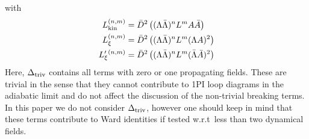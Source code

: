 \documentclass[a4paper,12pt]{article}
\newcommand{\Lkin}{L_{\rm kin}}
\newcommand{\Lxi}{L_{\xi}}
\newcommand{\Lxib}{L_{\xi}'{}}
\begin{document}
with
\begin{align}
\Lkin^{(n,m)} &= \bar D^2 \left( (\Lambda \bar \Lambda)^n L^m A \bar A \right) 
 \\
\Lxi^{(n,m)} &= \bar D^2 \left( (\Lambda \bar \Lambda)^n  L^m (\Lambda A)^2
 \right) 
\\
\Lxib^{(n,m)} &= \bar D^2 \left( (\Lambda \bar \Lambda)^n
 L^m (\bar \Lambda \bar   A) ^2 \right)
\end{align}
Here, $\Delta_{\rm triv}$ contains all terms with zero or one propagating
fields. These are trivial in the sense that they cannot contribute to 1PI
loop diagrams in the adiabatic limit and do not affect the discussion of
the non-trivial
breaking terms. In this paper we do not consider $\Delta_{\rm triv}$,
however one should keep in mind that these terms contribute to Ward
identities if tested w.r.t\ less than two dynamical fields.
\end{document}
